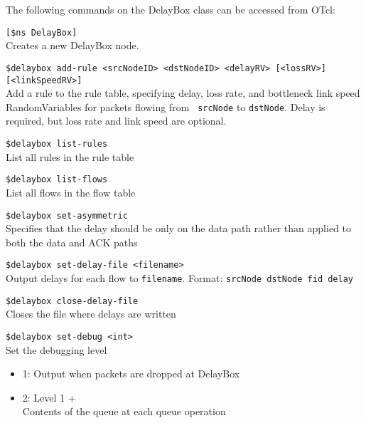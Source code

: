 The following commands on the DelayBox class can be accessed from OTcl:

{\tt [\$ns DelayBox]}\\
Creates a new DelayBox node.

{\tt \$delaybox add-rule <srcNodeID> <dstNodeID> <delayRV> [<lossRV>] [<linkSpeedRV>]}\\
  Add a rule to the rule table, specifying delay, loss rate, and
  bottleneck link speed RandomVariables for packets flowing from {\tt
  srcNode} to {\tt dstNode}.  Delay is required, but loss rate and
  link speed are optional.

{\tt \$delaybox list-rules}\\
List all rules in the rule table

{\tt \$delaybox list-flows}\\
List all flows in the flow table

{\tt \$delaybox set-asymmetric}\\
Specifies that the delay should be only on the data path rather than
applied to both the data and ACK paths

{\tt \$delaybox set-delay-file <filename>}\\
Output delays for each flow to {\tt filename}.  Format: {\tt srcNode
dstNode fid delay} 

{\tt \$delaybox close-delay-file}\\
Closes the file where delays are written

{\tt \$delaybox set-debug <int>}\\
Set the debugging level
\begin{itemize}
\item{1: Output when packets are dropped at DelayBox}
\item{2: Level 1 + \\
Contents of the queue at each queue operation
}
\end{itemize}


